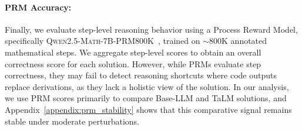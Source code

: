 \documentclass[11pt]{article}
\def \task{\textsc{TIM}\xspace}
\newcommand{\pouya}[1]{{\color{violet}Pouya: #1}}
\begin{document}
\paragraph{PRM Accuracy:}
\label{sec:prm}
Finally, we evaluate step-level reasoning behavior using a Process Reward Model, specifically \textsc{Qwen2.5-Math-7B-PRM800K}~\citep{zheng-etal-2025-processbench}, trained on $\sim$800K annotated mathematical steps. We aggregate step-level scores to obtain an overall correctness score for each solution. However, while PRMs evaluate step correctness, they may fail to detect reasoning shortcuts where code outputs replace derivations, as they lack a holistic view of the solution. In our analysis, we use PRM scores primarily to compare Base-LLM and TaLM solutions, and Appendix~\ref{appendix:prm_stability} shows that this comparative signal remains stable under moderate perturbations. 
\end{document}
